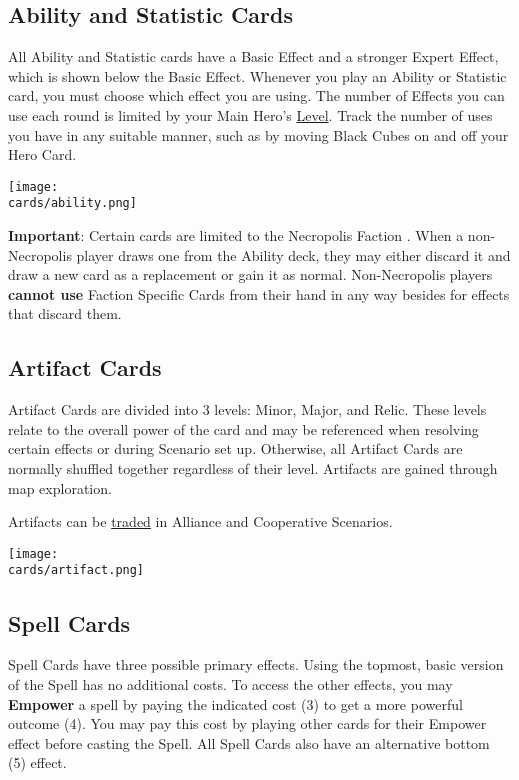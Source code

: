 \begin{multicols*}{2}
\clearpage

\subsection*{\hypertarget{Ability}{Ability and Statistic Cards}}

All Ability and Statistic cards have a Basic Effect and a stronger Expert  Effect, which is shown below the Basic Effect.
Whenever you play an Ability or Statistic card, you must choose which effect you are using.
The number of  Effects you can use each round is limited by your Main Hero's \hyperlink{Level}{Level}.
Track the number of uses you have in any suitable manner, such as by moving Black Cubes on and off your Hero Card.\par
\bigskip

\texttt{[image: \\cards/ability.png]}

\textbf{Important}: Certain cards are limited to the Necropolis Faction .
When a non-Necropolis player draws one from the Ability deck, they may either discard it and draw a new card as a replacement or gain it as normal.
Non-Necropolis players \textbf{cannot use} Faction Specific Cards from their hand in any way besides for effects that discard them.

\subsection*{Artifact Cards}
Artifact Cards are divided into 3 levels: Minor, Major, and Relic.
These levels relate to the overall power of the card and may be referenced when resolving certain effects or during Scenario set up.
Otherwise, all Artifact Cards are normally shuffled together regardless of their level.
Artifacts are gained through map exploration.\par
Artifacts can be \hyperlink{Trading}{traded} in Alliance and Cooperative Scenarios.\par
\texttt{[image: \\cards/artifact.png]}

\subsection*{\hypertarget{spells}{Spell Cards}}


Spell Cards have three possible primary effects.
Using the topmost, basic version of the Spell has no additional costs.
To access the other effects, you may \textbf{Empower} a spell by paying the indicated cost (3) to get a more powerful outcome (4).
You may pay this cost by playing other cards for their Empower  effect before casting the Spell.
All Spell Cards also have an alternative bottom (5)  effect.\par


\end{multicols*}

